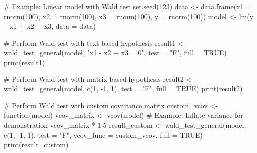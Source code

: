 \documentclass[a4paper]{book}
\begin{document}
%
\begin{Examples}
\begin{ExampleCode}
# Example: Linear model with Wald test
set.seed(123)
data <- data.frame(x1 = rnorm(100), x2 = rnorm(100), x3 = rnorm(100), y = rnorm(100))
model <- lm(y ~ x1 + x2 + x3, data = data)

# Perform Wald test with text-based hypothesis
result1 <- wald_test_general(model, "x1 - x2 + x3 = 0", test = "F", full = TRUE)
print(result1)

# Perform Wald test with matrix-based hypothesis
result2 <- wald_test_general(model, c(1, -1, 1), test = "F", full = TRUE)
print(result2)

# Perform Wald test with custom covariance matrix
custom_vcov <- function(model) {
  vcov_matrix <- vcov(model)
  # Example: Inflate variance for demonstration
  vcov_matrix * 1.5
}
result_custom <- wald_test_general(model, c(1, -1, 1), test = "F", vcov_func = custom_vcov, full = TRUE)
print(result_custom)

\end{ExampleCode}
\end{Examples}
\end{document}
